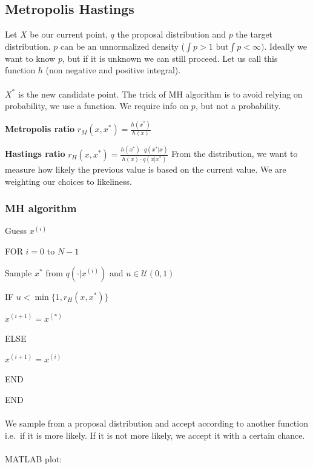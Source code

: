 \subsection{Metropolis Hastings}

Let $X$ be our current point, $q$ the proposal distribution and $p$ the
target distribution. $p$ can be an unnormalized density
($\int p > 1 \text{ but} \int p < \infty)$. Ideally we want to know $p$,
but if it is unknown we can still proceed. Let us call this function $h$
(non negative and positive integral).
\\
\\
\noindent
$X^*$ is the new candidate point. The trick of MH algorithm is to avoid
relying on probability, we use a function. We require info on $p$, but
not a probability.

\textbf{Metropolis ratio} $r_M(x,x^*)=\frac{h(x^*)}{h(x)}$

\textbf{Hastings ratio}
$r_H(x,x^*)=\frac{h(x^*)\cdot q(x^*|x)}{h(x)\cdot q(x|x^*)}$
\noindent
From the distribution, we want to measure how likely the previous value
is based on the current value. We are weighting our choices to
likeliness.


\subsubsection{MH algorithm}

Guess $x^{(i)}$

FOR $i=0$ to $N-1$

Sample $x^*$ from $q(\cdot|x^{(i)})$ and $u \in \mathcal{U}(0,1)$

IF $u < \min \{1, r_H(x,x^*) \}$

$x^{(i+1)}=x^{(*)}$

ELSE

$x^{(i+1)}=x^{(i)}$

END

END
\\
\\
\noindent
We sample from a proposal distribution and accept according to another
function i.e.~if it is more likely. If it is not more likely, we accept
it with a certain chance.
\\
\\
\noindent
MATLAB plot:

